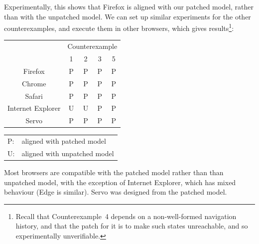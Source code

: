 \documentclass{notes}
\begin{document}
Experimentally, this shows that Firefox is aligned with our patched model, rather than
with the unpatched model. We can set up similar experiments for the other counterexamples,
and execute them in other browsers, which gives results\footnote{%
  Recall that Counterexample~4 depends on a non-well-formed navigation history,
  and that the patch for it is to make such states unreachable, and so
  experimentally unverifiable.
}:
\begin{center}
 {\sffamily
  \begin{tabular}{ccccc}
    \rowcolor{black!50!blue}
    & \multicolumn{4}{c}{\color{white} Counterexample} \\
    \rowcolor{black!50!blue}
    & \color{white}1 & \color{white}2 & \color{white}3 & \color{white}5 \\
    \rowcolor{white!90!blue}
    Firefox           & P  & P  & P  & P \\
    Chrome            & P  & P  & P  & P \\
    \rowcolor{white!90!blue}
    Safari            & P  & P  & P  & P \\
    Internet Explorer & U  & U  & P  & P \\
    \rowcolor{white!90!blue}
    Servo             & P  & P  & P  & P \\
  \end{tabular}
 }
 \quad
 \begin{tabular}{ll}
   \textsf{P}:& aligned with patched model \\
   \textsf{U}:& aligned with unpatched model \\
 \end{tabular}
\end{center}
Most browsers are compatible with the patched model rather than than
unpatched model, with the exception of Internet Explorer, which has mixed behaviour
(Edge is similar). Servo was designed from the patched model.
\end{document}
